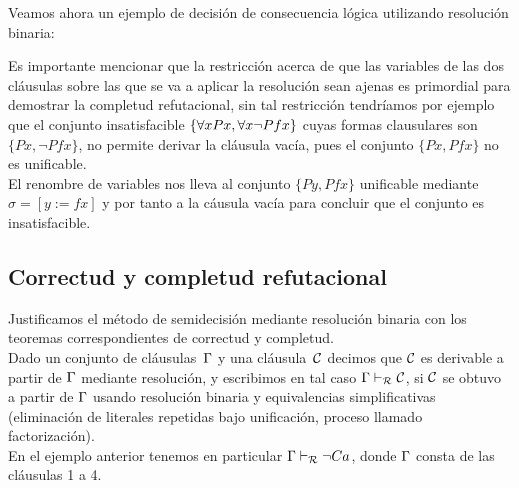 \documentclass[11pt,letterpaper]{article}
\begin{document}
\medskip

\noindent Veamos ahora un ejemplo de decisión de consecuencia lógica utilizando 
resoluci\'on binaria:

Es importante mencionar que la restricción acerca de que las variables de las 
dos cláusulas sobre las que se va a aplicar la resolución sean ajenas es 
primordial para demostrar la completud refutacional, sin tal restricción 
tendr\'iamos por ejemplo que el conjunto insatisfacible 
$\{\forall x Px,\forall x \neg Pfx\}$  cuyas formas clausulares son $\{Px,\neg Pfx\}$, 
no permite derivar la cláusula vacía, pues el conjunto $\{Px,Pfx\}$ no es 
unificable.\\
El renombre de variables nos lleva al conjunto $\{Py,Pfx\}$ unificable
mediante $\sigma=[y:=fx]$ y por tanto a la c\'ausula vacía para concluir que el 
conjunto es insatisfacible.

\subsection{Correctud y completud refutacional}

Justificamos el método de semidecisión mediante resolución binaria con los 
teoremas correspondientes de correctud y completud. \\

Dado un conjunto de cláusulas~$\Gamma$ y una cláusula~$\mathcal{C}$ decimos que $\mathcal{C}$ es
derivable a partir de $\Gamma$ mediante resolución, y escribimos en tal caso
$\Gamma\vdash_\mathcal{R}\mathcal{C}$, si $\mathcal{C}$ se obtuvo a partir de $\Gamma$ usando
resolución binaria y equivalencias simplificativas (eliminación de literales
repetidas bajo unificación, proceso llamado factorización). \\
En el ejemplo anterior tenemos en particular $\Gamma\vdash_\mathcal{R} \neg Ca$, 
donde $\Gamma$ consta de las cláusulas 1 a 4.
\end{document}
